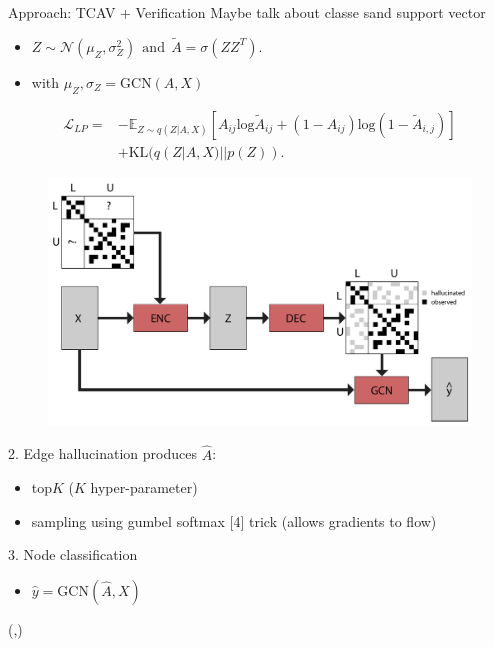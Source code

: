\documentclass[final]{beamer}
\begin{document}
\begin{frame}[fragile]{}
\begin{textblock}{\colwidth}
\begin{paddedBlock}{Approach: TCAV + Verification}
\alert{Maybe talk about classe sand support vector}
\begin{itemize}
  \item $Z\sim\mathcal{N}(\mu_Z,\sigma_Z^2)\ \ \mathrm{and}\ \ \tilde{A}=\sigma(ZZ^T).$
  \item with $\mu_Z,\sigma_Z=\mathrm{GCN}(A, X)$
\end{itemize}
\begin{align*}
\mathcal{L}_{LP}=&-\mathbb{E}_{Z\sim q(Z|A,X)}[A_{ij}\mathrm{log}\tilde{A}_{ij}+(1-A_{ij})\mathrm{log}(1-\tilde{A}_{i,j})]\\
&+\mathrm{KL}(q(Z|A,X)||p(Z)).
\end{align*}
\begin{figure}
    \centering
    \includegraphics[width=.8\textwidth]{img/model_big.pdf}
    \label{fig:big}
\end{figure}
\alert{2. Edge hallucination}
  produces $\hat{A}$:
  \begin{itemize}
    \item top$K$ ($K$ hyper-parameter)
    \item sampling using gumbel softmax [4] trick (allows gradients to flow)
  \end{itemize}
\alert{3. Node classification}
\begin{itemize}
	\item $\hat{y} = \mathrm{GCN}(\hat{A}, X)$
\end{itemize}

\end{paddedBlock}
\end{textblock}


\begin{textblock}{\colwidth}(\thirdcolpos,\vstartCols)


\end{textblock}
\end{frame}
\end{document}
